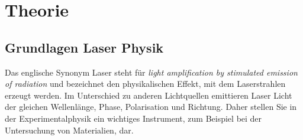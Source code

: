 \section{Theorie}
\label{sec:Theorie}

\subsection{Grundlagen Laser Physik}
\label{sec:Grundlagen}
Das englische Synonym Laser steht für \textit{light amplification by stimulated emission of radiation}
und bezeichnet den physikalischen Effekt, mit dem  Laserstrahlen erzeugt werden.
Im Unterschied zu anderen Lichtquellen emittieren Laser Licht der gleichen Wellenlänge, Phase, Polarisation und Richtung. 
Daher stellen Sie in der Experimentalphysik ein wichtiges Instrument, zum Beispiel bei der Untersuchung von Materialien, dar.


